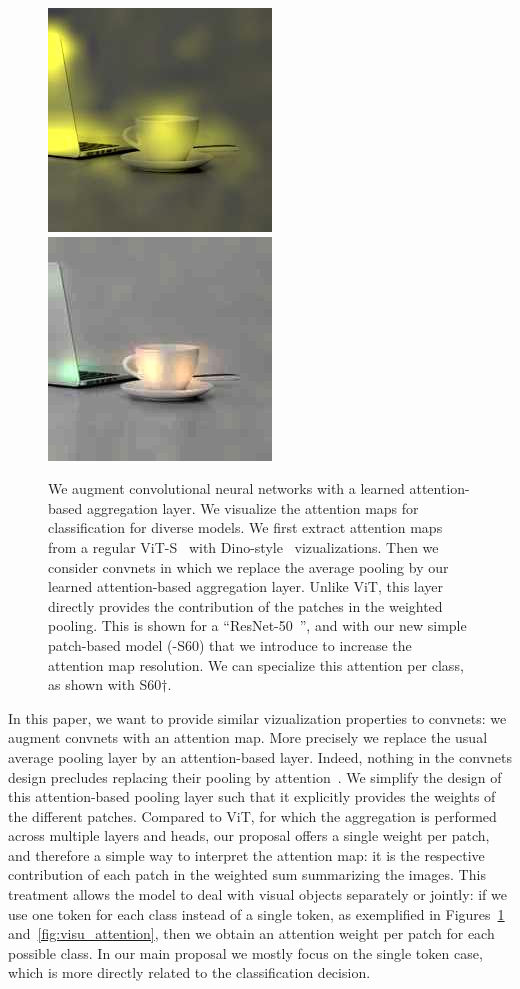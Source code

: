 \begin{figure}[t]
         \includegraphics[width = 0.19\linewidth]{figs/attention_fig_main/gray_S60_attention_mean_pexels-pixabay-257894.jpg} \hfill
         \includegraphics[width = 0.19\linewidth]{figs/attention_fig_main/gray_attn_multi_pexels-pixabay-257894.jpg}\\%
    \vspace{-3.0ex}
    \caption{We augment convolutional neural networks with a learned attention-based aggregation layer. We visualize the attention maps for classification for diverse models. We first extract attention maps from a regular ViT-S~\cite{dosovitskiy2020image,Touvron2020TrainingDI} with Dino-style~\cite{caron2021emerging} vizualizations. Then we consider convnets in which we replace the average pooling by our learned attention-based aggregation layer. Unlike ViT, this layer directly provides the contribution of the patches in the weighted pooling. 
    This is shown for a ``ResNet-50~\cite{He2016ResNet}'', and with our new simple patch-based model (\ournet{}-S60) that we introduce to increase the attention map resolution. 
    We can specialize this attention per class, as shown with S60$\dagger$. 
    \label{fig:attention_maps_intro}}
\end{figure}



In this paper, we want to provide similar vizualization properties to convnets: %
we augment convnets with an attention map.  %
More precisely we replace the usual average pooling layer by an attention-based layer. 
Indeed, nothing in the convnets design precludes replacing their pooling by attention~\cite{Bello2019AttentionAC}. 
We simplify the design of this attention-based pooling layer such that it explicitly provides the weights of the different patches. %
Compared to ViT, for which the aggregation is performed across multiple layers and heads, our proposal offers a single weight per patch, and therefore a simple way to interpret the attention map: it is the respective contribution of each patch in the weighted sum summarizing the images. 
%
This treatment allows the model to deal with visual objects separately or jointly: if we use one token for each class instead of a single token, as exemplified in Figures~\ref{fig:attention_maps_intro} and~\ref{fig:visu_attention}, then we obtain an attention weight per patch for each possible class. In our main proposal we mostly focus on the single token case, which is more directly related to the classification decision. 


